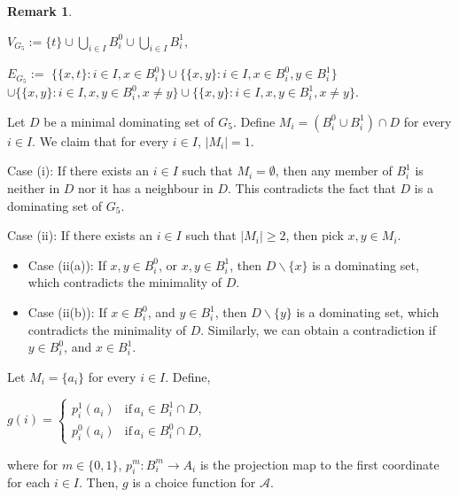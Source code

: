 \documentclass[12pt,reqno,a4paper]{amsart}
\theoremstyle{definition}
\newtheorem{remark}[defn]{Remark}
\begin{document}
\begin{remark}
		\begin{flushleft}
			$V_{G_{5}} := \{t\} \cup \bigcup_{i\in I} B_i^0\cup \bigcup_{i\in I} B_i^1$,
			
			$E_{G_{5}}:=$
			$\bigg\{\{x,t\}:i\in I, x\in B^0_i\bigg\}\cup \bigg\{\{x,y\}:i\in I,x\in B^0_i, y\in B^1_i\bigg\}$ $\cup \bigg\{\{x,y\}:i\in I, x,y\in B^0_i, x\not=y\bigg\}\cup \bigg\{\{x,y\}:i\in I, x,y\in B^1_i, x\not=y\bigg\}$. 
		\end{flushleft}
		
		Let $D$ be a minimal dominating set of $G_{5}$. Define $M_{i}=(B^0_i\cup B^1_i) \cap D$ for every $i\in I$. 
		We claim that for every $i\in I$, $\vert M_{i}\vert=1$. 
		
		Case (i): If there exists an $i\in I$ such that 
		$M_{i}=\emptyset$, then 
		any member of $B^1_i$ is neither in $D$ nor it has a neighbour in $D$. This contradicts the fact that $D$ is a dominating set of $G_{5}$.
		
		Case (ii): If there exists an $i\in I$ such that $\vert M_{i}\vert \geq 2$, then pick $x,y\in M_{i}$. 
		
		\begin{itemize}
			\item Case (ii(a)): If $x,y\in B^0_i$, or $x,y\in B^1_i$, then $D\backslash\{x\}$ is a dominating set, which contradicts the minimality of $D$. 
			\item Case (ii(b)): If $x\in B^0_i$, and $y\in B^1_i$, then $D\backslash\{y\}$ is a dominating set, which contradicts the minimality of $D$.
			Similarly, we can obtain a contradiction if $y\in B^0_i$, and $x\in B^1_i$.
		\end{itemize}
		Let $M_{i}=\{a_{i}\}$ for every $i\in I$.
		Define,
		\begin{center}
			$g(i) =
			\begin{cases} 
				p^{1}_{i}(a_{i}) & \text{if}\, a_{i}\in B^1_i\cap D, \\
				
				p^{0}_i(a_{i})& \text{if} \, a_{i}\in B^0_i\cap D,
			\end{cases}$
		\end{center}
		
		where for $m\in \{0,1\}$, $p^{m}_{i}: B^m_i\rightarrow A_{i}$ is the projection map to the first coordinate for  each $i\in I$. Then, $g$ is a choice function for $\mathcal{A}$. 
	\end{remark}
	
\end{document}
